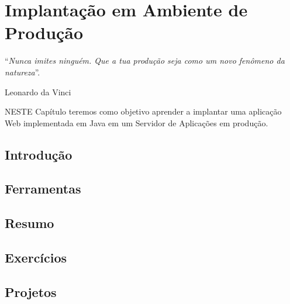\chapter{Implantação em Ambiente de Produção}\label{cap:implantacao}
\epigraph{``\textit{Nunca imites ninguém. Que a tua produção seja como um novo fenômeno da natureza}''.}{Leonardo da Vinci}

\lettrine[lines=4, lhang=0.1, lraise=0, loversize=0.2, findent=0.1em]{\textcolor{corAzulTema}{N}}{ESTE} Capítulo teremos como objetivo aprender a implantar uma aplicação Web implementada em Java em um Servidor de Aplicações em produção.

\section{Introdução}

\section{Ferramentas}

\section{Resumo}

\section{Exercícios}

\section{Projetos}
